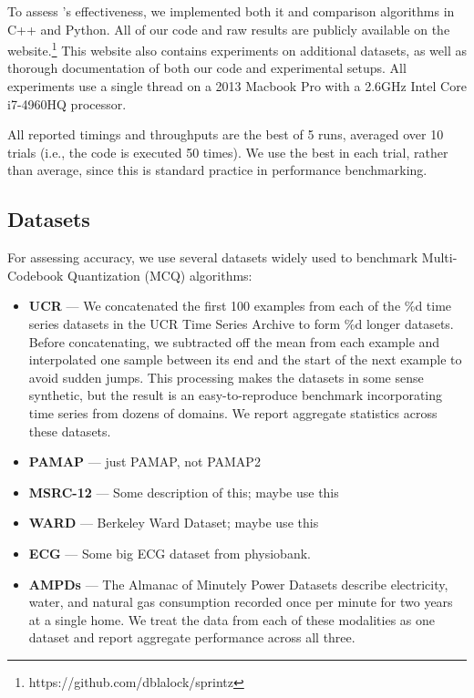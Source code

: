 
To assess \mine's effectiveness, we implemented both it and comparison algorithms in C++ and Python. All of our code and raw results are publicly available on the \mine website.\footnote{https://github.com/dblalock/sprintz} This website also contains experiments on additional datasets, as well as thorough documentation of both our code and experimental setups. All experiments use a single thread on a 2013 Macbook Pro with a 2.6GHz Intel Core i7-4960HQ processor.

All reported timings and throughputs are the best of 5 runs, averaged over 10 trials (i.e., the code is executed 50 times). We use the best in each trial, rather than average, since this is standard practice in performance benchmarking.

\subsection{Datasets}

For assessing accuracy, we use several datasets widely used to benchmark Multi-Codebook Quantization (MCQ) algorithms:
\begin{itemize}[leftmargin=4mm]
\item \textbf{UCR} \cite{ucrTimeSeries} --- We concatenated the first 100 examples from each of the \%d time series datasets in the UCR Time Series Archive \cite{ucrTimeSeries} to form \%d longer datasets. Before concatenating, we subtracted off the mean from each example and interpolated one sample between its end and the start of the next example to avoid sudden jumps. This processing makes the datasets in some sense synthetic, but the result is an easy-to-reproduce benchmark incorporating time series from dozens of domains. We report aggregate statistics across these datasets.
\item \textbf{PAMAP} \cite{PAMAP} --- just PAMAP, not PAMAP2
\item \textbf{MSRC-12} \cite{msrc} --- Some description of this; maybe use this
\item \textbf{WARD} \cite{ward} --- Berkeley Ward Dataset; maybe use this
\item \textbf{ECG} \cite{physiobank} --- Some big ECG dataset from physiobank.
\item \textbf{AMPDs} \cite{ampds} --- The Almanac of Minutely Power Datasets describe electricity, water, and natural gas consumption recorded once per minute for two years at a single home. We treat the data from each of these modalities as one dataset and report aggregate performance across all three.
\end{itemize}


